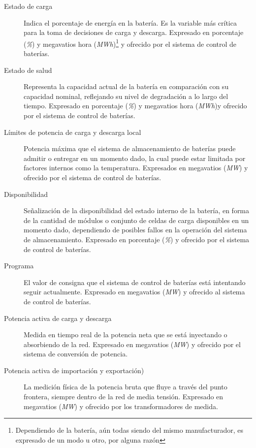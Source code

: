 \begin{description}

  \item[Estado de carga] Indica el porcentaje de energía en la batería. Es la variable más crítica para la toma de decisiones de carga y descarga. Expresado en porcentaje (\textit{\%}) y megavatios hora (\textit{MWh})\footnote{Dependiendo de la batería, aún todas siendo del mismo manufacturador, es expresado de un modo u otro, por alguna razón} y ofrecido por el sistema de control de baterías.

  \item[Estado de salud] Representa la capacidad actual de la batería en comparación con su capacidad nominal, reflejando su nivel de degradación a lo largo del tiempo. Expresado en porcentaje (\textit{\%}) y megavatios hora (\textit{MWh})\footnotemark[\value{footnote}] y ofrecido por el sistema de control de baterías.

  \item[Límites de potencia de carga y descarga local] Potencia máxima que el sistema de almacenamiento de baterías puede admitir o entregar en un momento dado, la cual puede estar limitada por factores internos como la temperatura. Expresados en megavatios (\textit{MW}) y ofrecido por el sistema de control de baterías.

  \item[Disponibilidad] Señalización de la disponibilidad del estado interno de la batería, en forma de la cantidad de módulos o conjunto de celdas de carga disponibles en un momento dado, dependiendo de posibles fallos en la operación del sistema de almacenamiento. Expresado en porcentaje (\textit{\%}) y ofrecido por el sistema de control de baterías.

  \item[Programa] El valor de consigna que el sistema de control de baterías está intentando seguir actualmente. Expresado en megavatios (\textit{MW}) y ofrecido al sistema de control de baterías.

  \item[Potencia activa de carga y descarga] Medida en tiempo real de la potencia neta que se está inyectando o absorbiendo de la red. Expresado en megavatios (\textit{MW}) y ofrecido por el sistema de conversión de potencia.

\item[Potencia activa de importación y exportación)] La medición física de la potencia bruta que fluye a través del punto frontera, siempre dentro de la red de media tensión. Expresado en megavatios (\textit{MW}) y ofrecido por los transformadores de medida.


\end{description}
